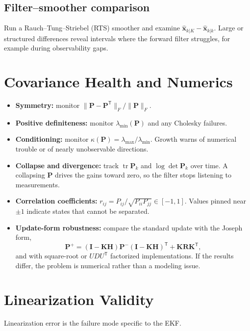 \documentclass[11pt]{article}
\newcommand{\xhat}{\hat{\bm{x}}}
\newcommand{\Pm}{\bm{P}}
\newcommand{\Hm}{\bm{H}}
\newcommand{\Km}{\bm{K}}
\newcommand{\Rm}{\bm{R}}
\newcommand{\Id}{\bm{I}}
\newcommand{\T}{^{\mathsf{T}}}
\begin{document}
\subsection{Filter--smoother comparison}
Run a Rauch--Tung--Striebel (RTS) smoother and examine $\xhat_{k|K} - \xhat_{k|k}$.
Large or structured differences reveal intervals where the forward filter struggles,
for example during observability gaps.

\section{Covariance Health and Numerics}
\label{sec:numerics}
\begin{itemize}
  \item \textbf{Symmetry:} monitor $\|\Pm - \Pm\T\|_F / \|\Pm\|_F$.
  \item \textbf{Positive definiteness:} monitor $\lambda_{\min}(\Pm)$ and any
        Cholesky failures.
  \item \textbf{Conditioning:} monitor $\kappa(\Pm) = \lambda_{\max}/\lambda_{\min}$.
        Growth warns of numerical trouble or of nearly unobservable directions.
  \item \textbf{Collapse and divergence:} track $\operatorname{tr}\Pm_k$ and
        $\log\det\Pm_k$ over time. A collapsing $\Pm$ drives the gains toward zero, so the
        filter stops listening to measurements.
  \item \textbf{Correlation coefficients:}
        $r_{ij} = P_{ij}/\sqrt{P_{ii}P_{jj}} \in [-1,1]$. Values pinned near $\pm1$
        indicate states that cannot be separated.
  \item \textbf{Update-form robustness:} compare the standard update with the Joseph form,
        \begin{equation}
          \Pm^+ = (\Id - \Km\Hm)\Pm^-(\Id - \Km\Hm)\T + \Km\Rm\Km\T,
        \end{equation}
        and with square-root or $UDU\T$ factorized implementations. If the results
        differ, the problem is numerical rather than a modeling issue.
\end{itemize}

\section{Linearization Validity}
\label{sec:linearization}
Linearization error is the failure mode specific to the EKF.
\end{document}
